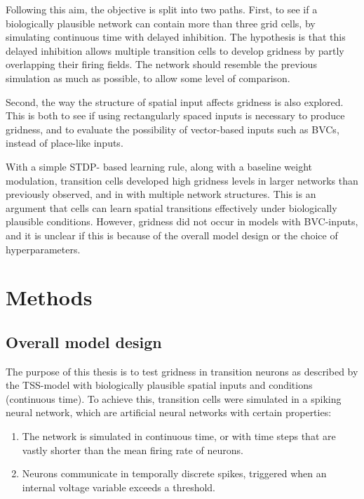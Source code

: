 \documentclass{article}
\begin{document}
    Following this aim, the objective is split into two paths. First, to see if a biologically plausible network can contain more than three grid cells, by simulating continuous time with delayed inhibition. The hypothesis is that this delayed inhibition allows multiple transition cells to develop gridness by partly overlapping their firing fields. The network should resemble the previous simulation as much as possible, to allow some level of comparison.

    Second, the way the structure of spatial input affects gridness is also explored. This is both to see if using rectangularly spaced inputs is necessary to produce gridness, and to evaluate the possibility of vector-based inputs such as BVCs, instead of place-like inputs.

    With a simple STDP- based learning rule, along with a baseline weight modulation, transition cells developed high gridness levels in larger networks than previously observed, and in with multiple network structures. This is an argument that cells can learn spatial transitions effectively under biologically plausible conditions. However, gridness did not occur in models with BVC-inputs, and it is unclear if this is because of the overall model design or the choice of hyperparameters.
        
    \section{Methods} \label{Methods}
    \subsection{Overall model design} \label{Overall Method}
    The purpose of this thesis is to test gridness in transition neurons as described by the TSS-model with biologically plausible spatial inputs and conditions (continuous time). To achieve this, transition cells were simulated in a spiking neural network, which are artificial neural networks with certain properties:
    \begin{enumerate}
        \item The network is simulated in continuous time, or with time steps that are vastly shorter than the mean firing rate of neurons.
        \item Neurons communicate in temporally discrete spikes, triggered when an internal voltage variable exceeds a threshold.
    \end{enumerate}
    
\end{document}
